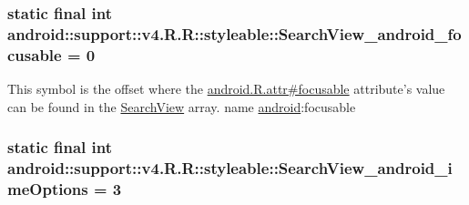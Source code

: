 \hypertarget{classandroid_1_1support_1_1v4_1_1_r_1_1styleable_e995a1e9fe744b38a1cd3db6e38b9003}{
\subsubsection[{SearchView\_\-android\_\-focusable}]{\setlength{\rightskip}{0pt plus 5cm}static final int android::support::v4.R.R::styleable::SearchView\_\-android\_\-focusable = 0}}
\label{classandroid_1_1support_1_1v4_1_1_r_1_1styleable_e995a1e9fe744b38a1cd3db6e38b9003}


This symbol is the offset where the \hyperlink{}{android.R.attr\#focusable} attribute's value can be found in the \hyperlink{classandroid_1_1support_1_1v4_1_1_r_1_1styleable_63a589da97c59fb7eebd9759edb31f0d}{SearchView} array.  name \hyperlink{namespaceandroid}{android}:focusable \hypertarget{classandroid_1_1support_1_1v4_1_1_r_1_1styleable_924ffeb8267d0e19f5948a2ccbf8b1b2}{
\subsubsection[{SearchView\_\-android\_\-imeOptions}]{\setlength{\rightskip}{0pt plus 5cm}static final int android::support::v4.R.R::styleable::SearchView\_\-android\_\-imeOptions = 3}}
\label{classandroid_1_1support_1_1v4_1_1_r_1_1styleable_924ffeb8267d0e19f5948a2ccbf8b1b2}


